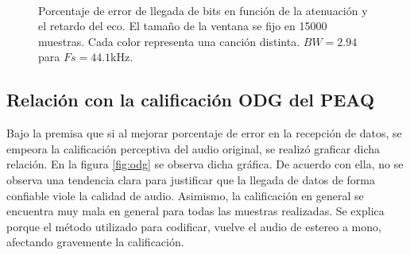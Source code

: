 \documentclass[conference]{IEEEtran}
\begin{document}
\begin{figure}[h]
    \centering
\\
 
  \caption{Porcentaje de error de llegada de bits en función de la atenuación y el retardo del eco. El tamaño de la ventana se fijo en 15000 muestras. Cada color representa una canción distinta. $BW=2.94$ para $Fs=44.1$kHz.}
  \label{fig:15000} 
\end{figure}

\subsection{Relación con la calificación ODG del PEAQ}
Bajo la premisa que si al mejorar porcentaje de error en la recepción de datos, se empeora la calificación perceptiva del audio original, se realizó graficar dicha relación. En la figura \ref{fig:odg} se observa dicha gráfica. De acuerdo con ella, no se observa una tendencia clara para justificar que la llegada de datos de forma confiable viole la calidad de audio. Asimismo, la calificación en general se encuentra muy mala en general para todas las muestras realizadas. Se explica porque el método utilizado para codificar, vuelve el audio de estereo a mono, afectando gravemente la calificación.
\end{document}
